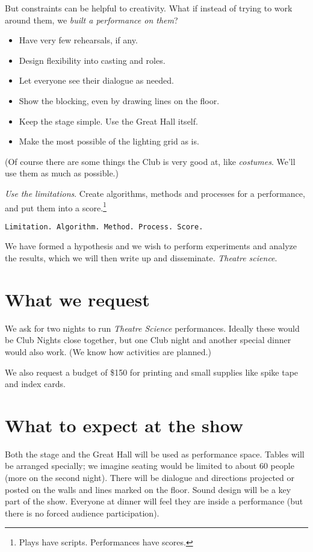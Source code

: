 \documentclass[11pt]{article}
\begin{document}
But constraints can be helpful to creativity.  What if instead of trying to work around them, we \textit{built a performance on them}?

\begin{itemize}

  \item Have very few rehearsals, if any.
  \item Design flexibility into casting and roles.
  \item Let everyone see their dialogue as needed.
  \item Show the blocking, even by drawing lines on the floor.
  \item Keep the stage simple.  Use the Great Hall itself.
  \item Make the most possible of the lighting grid as is.

\end{itemize}

(Of course there are some things the Club is very good at, like \textit{costumes}.  We'll use them as much as possible.)

\textit{Use the limitations}.  Create algorithms, methods and processes for a performance, and put them into a score.\footnote{Plays have scripts.  Performances have scores.}

\texttt{Limitation.  Algorithm.  Method.  Process. Score.}

We have formed a hypothesis and we wish to perform experiments and analyze the results, which we will then write up and disseminate. \textit{Theatre science}.

\section{What we request}

We ask for two nights to run \textit{Theatre Science} performances.  Ideally these would be Club Nights close together, but one Club night and another special dinner would also work.  (We know how activities are planned.)

We also request a budget of \$150 for printing and small supplies like spike tape and index cards.

\section{What to expect at the show}

Both the stage and the Great Hall will be used as performance space.  Tables will be arranged specially; we imagine seating would be limited to about 60 people (more on the second night).  There will be dialogue and directions projected or posted on the walls and lines marked on the floor.  Sound design will be a key part of the show.  Everyone at dinner will feel they are inside a performance (but there is no forced audience participation).
\end{document}
